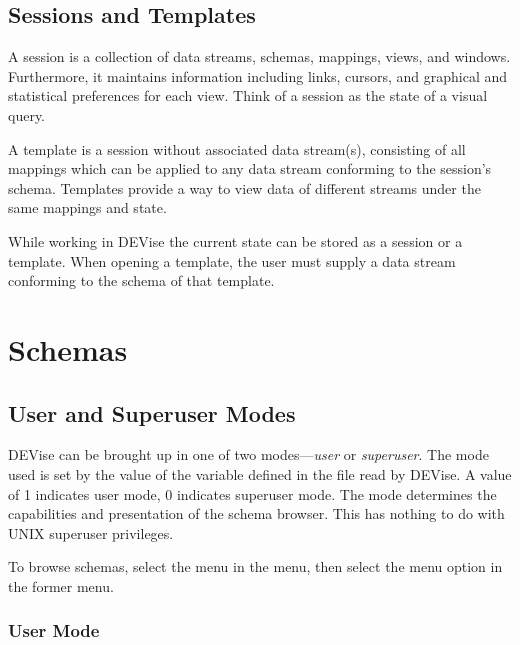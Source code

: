 \subsection{Sessions and Templates}

A session is a collection of data streams, schemas, mappings, views, and
windows. Furthermore, it maintains information including links, cursors, and
graphical and statistical preferences for each view. Think of a session as the
state of a visual query.

A template is a session without associated data stream(s), consisting of all
mappings which can be applied to any data stream conforming to the session's
schema. Templates provide a way to view data of different streams under the same
mappings and state.

While working in DEVise the current state can be stored as a session or a
template. When opening a template, the user must supply a data stream conforming
to the schema of that template.


\section{Schemas}
\label{sect:schema}


\subsection{User and Superuser Modes}

DEVise can be brought up in one of two modes---{\em user} or {\em superuser}.
The mode used is set by the value of the  variable defined in
the  file read by DEVise. A value of 1 indicates user mode, 0
indicates superuser mode. The mode determines the capabilities and presentation
of the schema browser.  This has nothing to do with UNIX superuser privileges.

To browse schemas, select the  menu in the  menu, then
select the  menu option in the former menu.

\subsubsection{User Mode}

